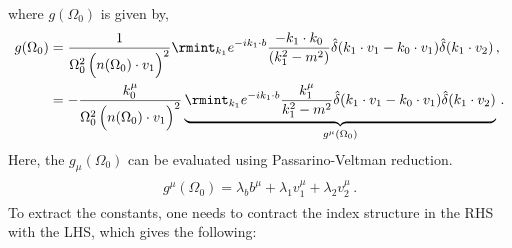 where $g(\Omega_0)$ is given by,
\begin{align}
    \begin{split}
        g(\Omega_0)&=\frac{1}{\Omega_0^2 \,\Big(n(\Omega_0)\cdot v_1 \Big)^2}\rmint_{k_1}e^{-ik_1\cdot b}\frac{-k_1\cdot k_0}{(k_1^2-m^2)}\hat\delta(k_1\cdot v_1-k_0\cdot v_1)\hat\delta(k_1\cdot v_2)\,,\\ &
        =-\frac{k_0^\mu}{\Omega_0^2 \,\Big(n(\Omega_0)\cdot v_1 \Big)^2}\underbrace{\rmint_{k_1}e^{-ik_1\cdot b}\frac{k_1^\mu}{k_1^2-m^2}\hat\delta(k_1\cdot v_1-k_0\cdot v_1)\hat\delta(k_1\cdot v_2)}_{g^\mu(\Omega_0)}\,.
    \end{split}
\end{align}
Here, the $g_\mu(\Omega_0)$ can be evaluated using Passarino-Veltman reduction.
\begin{align}
    \begin{split}
        g^{\mu}(\Omega_0)= \lambda_b b^\mu+\lambda_1 v_1^\mu+\lambda_2 v_2^\mu\,.
    \end{split}
\end{align}
To extract the constants, one needs to contract the index structure in the RHS with the LHS, which gives the following:

